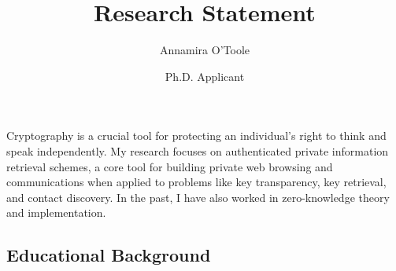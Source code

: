\documentclass{article}
\title{Research Statement}
\author{Annamira O'Toole}
\date{Ph.D. Applicant}
\newcommand{\aftersep}{\vspace{-0.3cm}}
\newcommand{\beforesep}{\vspace{-0.2cm}}
\begin{document}
\maketitle%
%

\vspace{-0.2cm}

Cryptography is a crucial tool for protecting an individual’s right to think and speak independently. My research focuses on authenticated private information retrieval schemes, a core tool for building private web browsing and communications when applied to problems like key transparency, key retrieval, and contact discovery. In the past, I have also worked in zero-knowledge theory and implementation.

\aftersep
\subsection*{Educational Background}
\beforesep
\end{document}
